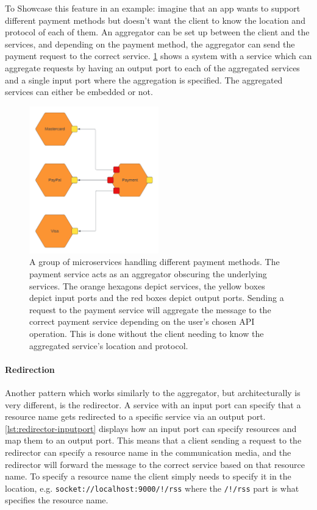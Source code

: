 To Showcase this feature in an example: imagine that an app wants to support different payment methods but doesn't want the client to know the location and protocol of each of them. An aggregator can be set up between the 
client and the services, and depending on the payment method, the aggregator can send the payment request to the correct service.
\cref{figure:aggregator_example} shows a system with a service which can aggregate requests by having an output port to each of the aggregated services and a single input port where the aggregation is specified. The aggregated services can either be embedded or not.
\begin{figure}[h!]
    \center
    \includegraphics[width=0.5\textwidth]{figures/aggregator_example.png}
    \caption{A group of microservices handling different payment methods. The payment service acts as an aggregator obscuring the underlying services. The orange hexagons depict services, the yellow boxes depict input ports and the red boxes depict output ports.
    Sending a request to the payment service will aggregate the message to the correct payment service depending on the user's chosen API operation. This is done without the client needing to know the aggregated service's location and protocol.}
    \label{figure:aggregator_example}
\end{figure}

\paragraph{Redirection} Another pattern which works similarly to the aggregator, but architecturally is very different, is the redirector.
A service with an input port can specify that a resource name gets redirected to a specific service via an output port.
\cref{lst:redirector-inputport} displays how an input port can specify resources and map them to an output port.
This means that a client sending a request to the redirector can specify a resource name in the communication media, and the redirector will forward the message to the correct service based on that resource name.
To specify a resource name the client simply needs to specify it in the location, e.g. \texttt{socket://localhost:9000/!/rss} where the \texttt{/!/rss} part is what specifies the resource name.

